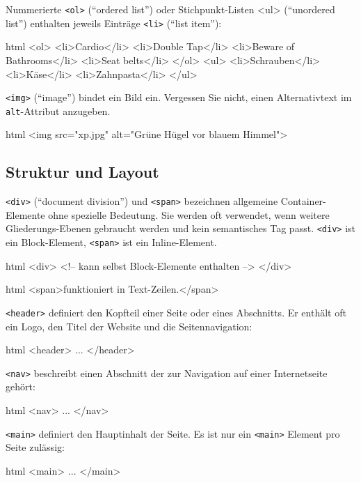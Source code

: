 \documentclass[10pt,a4paper]{article}
\begin{document}
\begin{multicols}{3}
Nummerierte \texttt{<ol>} (\enquote{ordered list}) oder Stichpunkt-Listen {<ul>} (\enquote{unordered list}) enthalten jeweils Einträge \texttt{<li>} (\enquote{list item}):
\begin{codebox}{html}{}
<ol>
  <li>Cardio</li>
  <li>Double Tap</li>
  <li>Beware of Bathrooms</li>
  <li>Seat belts</li>
</ol>
<ul>
  <li>Schrauben</li>
  <li>Käse</li>
  <li>Zahnpasta</li>
</ul>
\end{codebox}

\texttt{<img>} (\enquote{image}) bindet ein Bild ein. Vergessen Sie nicht, einen Alternativtext im \texttt{alt}-Attribut anzugeben.
\begin{codebox}{html}{}
<img src="xp.jpg" alt="Grüne Hügel vor blauem Himmel">
\end{codebox}

\subsection*{Struktur und Layout}

\texttt{<div>} (\enquote{document division}) und \texttt{<span>} bezeichnen allgemeine Container-Elemente ohne spezielle Bedeutung. Sie werden oft verwendet, wenn weitere Gliederungs-Ebenen gebraucht werden und kein semantisches Tag passt. \texttt{<div>} ist ein Block-Element, \texttt{<span>} ist ein Inline-Element.
\begin{codebox}{html}{}
<div>
  <!-- kann selbst Block-Elemente enthalten -->
</div>
\end{codebox}
\begin{codebox}{html}{}
<span>funktioniert in Text-Zeilen.</span>
\end{codebox}

\texttt{<header>} definiert den Kopfteil einer Seite oder eines Abschnitts. Er enthält oft ein Logo, den Titel der Website und die Seitennavigation:
\begin{codebox}{html}{}
<header> ... </header>
\end{codebox}

\texttt{<nav>} beschreibt einen Abschnitt der zur Navigation auf einer Internetseite gehört:
\begin{codebox}{html}{}
<nav> ... </nav>
\end{codebox}

\texttt{<main>} definiert den Hauptinhalt der Seite. Es ist nur ein \texttt{<main>} Element pro Seite zulässig:
\begin{codebox}{html}{}
<main> ... </main>
\end{codebox}


\end{multicols}
\end{document}
